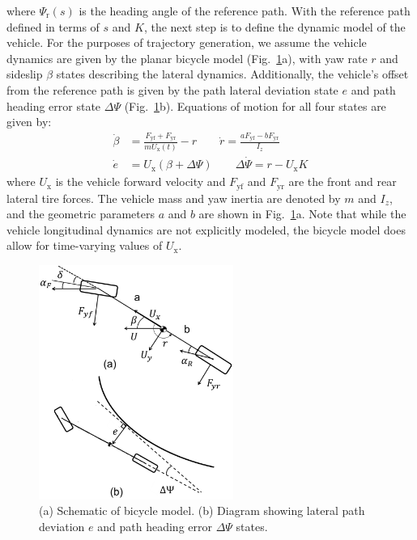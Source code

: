 \documentclass[twocolumn,10pt, final]{asme2e}
\begin{document}
where $\Psi_\mathrm{r}(s)$ is the heading angle of the reference path. With the reference path defined in terms of $s$ and $K$, the 
next step is to define the dynamic model of the vehicle. For the purposes of trajectory generation, we assume the vehicle dynamics are given 
by the planar bicycle model (Fig.~\ref{fig:bikemodel}a), with yaw rate $r$ and sideslip $\beta$ states describing the lateral dynamics. Additionally, the vehicle's offset from
the reference path is given by the path lateral deviation state $e$ and path heading error state $\Delta\Psi$ (Fig.~\ref{fig:bikemodel}b). Equations of
motion for all four states are given by:
\begin{subequations}
\label{eq:bm}
\begin{align}
	\dot{\beta} &= \frac{F_\mathrm{yf}+F_\mathrm{yr}}{mU_\mathrm{x}(t)} - r \qquad \dot{r} = \frac{aF_\mathrm{yf} - bF_\mathrm{yr}}{I_z} \label{bm1} \\
	\dot{e} &= U_\mathrm{x} (\beta + \Delta\Psi) \qquad \Delta\dot{\Psi} = r - U_\mathrm{x}K \label{eq:bm2} 
\end{align}
\end{subequations}
where $U_\mathrm{x}$ is the vehicle forward velocity and $F_\mathrm{yf}$ and $F_\mathrm{yr}$ are the front and rear lateral tire forces. 
The vehicle mass and yaw inertia are denoted by $m$ and $I_z$, and the geometric parameters $a$ and $b$ are shown in Fig.~\ref{fig:bikemodel}a. Note
that while the vehicle longitudinal dynamics are not explicitly modeled, the bicycle model does allow for time-varying values of $U_\mathrm{x}$. 
\begin{figure}
\centering
\includegraphics[width=2.5in]{figures/BikeModelSchematic.png}
\caption{(a) Schematic of bicycle model. (b) Diagram showing lateral path deviation $e$ and path heading error $\Delta\Psi$ states.}
\label{fig:bikemodel}
\end{figure}
\end{document}
